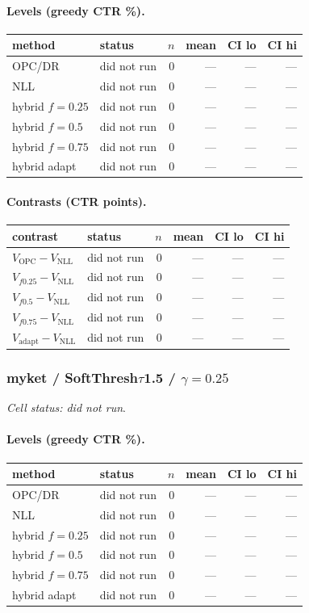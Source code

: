 \documentclass[10pt,a4paper]{article}
\begin{document}
\paragraph{Levels (greedy CTR \%).}
{\centering\small\begin{tabular}{llrrrr}
\toprule method & status & $n$ & mean & CI lo & CI hi \\
\midrule
OPC/DR & did not run & 0 & --- & --- & --- \\
NLL & did not run & 0 & --- & --- & --- \\
hybrid $f{=}0.25$ & did not run & 0 & --- & --- & --- \\
hybrid $f{=}0.5$ & did not run & 0 & --- & --- & --- \\
hybrid $f{=}0.75$ & did not run & 0 & --- & --- & --- \\
hybrid adapt & did not run & 0 & --- & --- & --- \\
\bottomrule\end{tabular}\par}
\paragraph{Contrasts (CTR points).}
{\centering\small\begin{tabular}{llrrrr}
\toprule contrast & status & $n$ & mean & CI lo & CI hi \\
\midrule
$V_{\mathrm{OPC}}-V_{\mathrm{NLL}}$ & did not run & 0 & --- & --- & --- \\
$V_{f0.25}-V_{\mathrm{NLL}}$ & did not run & 0 & --- & --- & --- \\
$V_{f0.5}-V_{\mathrm{NLL}}$ & did not run & 0 & --- & --- & --- \\
$V_{f0.75}-V_{\mathrm{NLL}}$ & did not run & 0 & --- & --- & --- \\
$V_{\mathrm{adapt}}-V_{\mathrm{NLL}}$ & did not run & 0 & --- & --- & --- \\
\bottomrule\end{tabular}\par}
\bigskip
\subsubsection{myket / SoftThresh$\tau$1.5 / $\gamma=0.25$}
\emph{Cell status: did not run}.
\paragraph{Levels (greedy CTR \%).}
{\centering\small\begin{tabular}{llrrrr}
\toprule method & status & $n$ & mean & CI lo & CI hi \\
\midrule
OPC/DR & did not run & 0 & --- & --- & --- \\
NLL & did not run & 0 & --- & --- & --- \\
hybrid $f{=}0.25$ & did not run & 0 & --- & --- & --- \\
hybrid $f{=}0.5$ & did not run & 0 & --- & --- & --- \\
hybrid $f{=}0.75$ & did not run & 0 & --- & --- & --- \\
hybrid adapt & did not run & 0 & --- & --- & --- \\
\bottomrule\end{tabular}\par}
\end{document}
